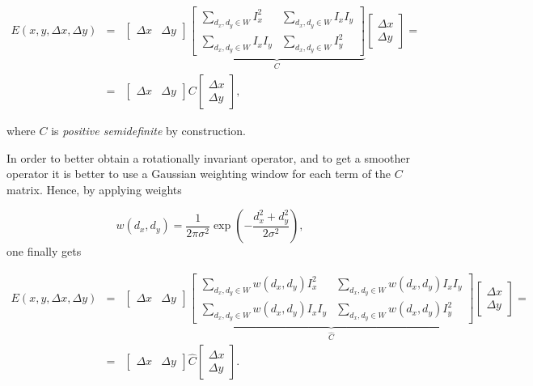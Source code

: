 \documentclass[10pt]{report}
\begin{document}
\[\begin{array}{lll}E(x, y, \Delta x, \Delta y) & = & \begin{bmatrix} \Delta x & \Delta y \end{bmatrix} \underbrace{\begin{bmatrix}\displaystyle  \sum_{d_x, d_y \in W} I^2_x & \displaystyle \sum_{d_x, d_y \in W} I_x I_y \\ \displaystyle \sum_{d_x, d_y \in W} I_x I_y & \displaystyle \sum_{d_x, d_y \in W} I^2_y \end{bmatrix}}_{C} \begin{bmatrix} \Delta x \\ \Delta y \end{bmatrix} = \\ & = & \begin{bmatrix} \Delta x & \Delta y \end{bmatrix} C \begin{bmatrix} \Delta x \\ \Delta y \end{bmatrix},\end{array}\]

where \(C\) is \emph{positive semidefinite} by construction.

In order to better obtain a rotationally invariant operator, and to get
a smoother operator it is better to use a Gaussian weighting window for
each term of the \(C\) matrix. Hence, by applying weights

\[w(d_x, d_y) = \frac{1}{2 \pi \sigma^2}\exp{\left(-\frac{d_x^2 + d_y^2}{2\sigma^2}\right)},\]
one finally gets

\[\begin{array}{lll}E(x, y, \Delta x, \Delta y) & = & \begin{bmatrix} \Delta x & \Delta y \end{bmatrix} \underbrace{\begin{bmatrix}\displaystyle  \sum_{d_x, d_y \in W} w(d_x, d_y) I^2_x & \displaystyle  \sum_{d_x, d_y \in W} w(d_x, d_y) I_x I_y \\ \displaystyle  \sum_{d_x, d_y \in W} w(d_x, d_y) I_x I_y & \displaystyle \sum_{d_x, d_y \in W} w(d_x, d_y) I^2_y \end{bmatrix}}_{\hat C} \begin{bmatrix} \Delta x \\ \Delta y \end{bmatrix} = \\ & = & \begin{bmatrix} \Delta x & \Delta y \end{bmatrix} \hat{C} \begin{bmatrix} \Delta x \\ \Delta y \end{bmatrix}.\end{array}\]
\end{document}
